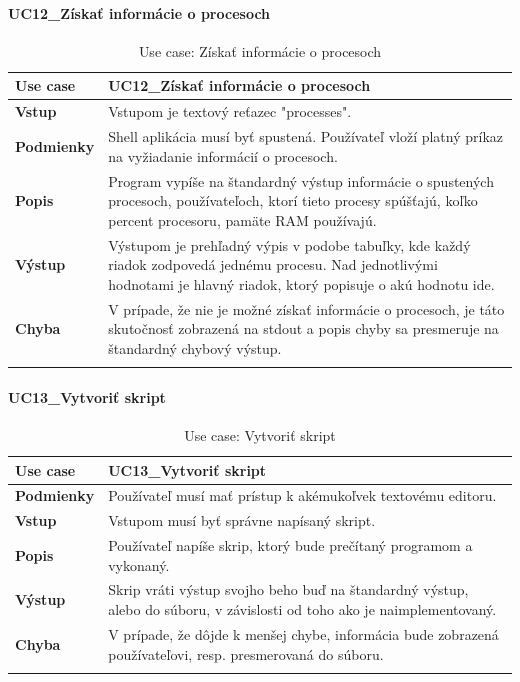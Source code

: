 \paragraph{UC12\_Získať informácie o procesoch}
\begin{center}
	\begin{longtable}{|p{2.5cm}|p{12.2cm}|}
		
			\hline
			\textbf{Use case} & UC12\_Získať informácie o procesoch \\ 
			\hline
			\textbf{Vstup} & Vstupom je textový reťazec "processes".\\
			\hline
			\textbf{Podmienky} & Shell aplikácia musí byť spustená. Používateľ vloží platný príkaz na vyžiadanie informácií o procesoch. \\ 
			\hline

			\textbf{Popis} & Program vypíše na štandardný výstup informácie o spustených procesoch, používateľoch, ktorí tieto procesy spúšťajú, koľko percent procesoru, pamäte RAM používajú.\\ 
			\hline

			\textbf{Výstup} & Výstupom je prehľadný výpis v podobe tabuľky, kde každý riadok zodpovedá jednému procesu. Nad jednotlivými hodnotami je hlavný riadok, ktorý popisuje o akú hodnotu ide.\\
			\hline
			\textbf{Chyba} & V prípade, že nie je možné získať informácie o procesoch, je táto skutočnosť zobrazená na stdout a popis chyby sa presmeruje na štandardný chybový výstup.\\
			\hline
		\caption{Use case: Získať informácie o procesoch}
		\label{table:1}
		
	\end{longtable}
\end{center}
\paragraph{UC13\_Vytvoriť skript}
\begin{center}
	\begin{longtable}{|p{2.5cm}|p{12.2cm}|}
		
			\hline
			\textbf{Use case} & UC13\_Vytvoriť skript \\ 
			\hline
			\textbf{Podmienky} & Používateľ musí mať prístup k akémukoľvek textovému editoru.  \\ 
			\hline
			\textbf{Vstup} & Vstupom musí byť správne napísaný skript. \\
			\hline
			\textbf{Popis} & Používateľ napíše skrip, ktorý bude prečítaný programom a vykonaný.\\ 
			\hline
			\textbf{Výstup} & Skrip vráti výstup svojho beho buď na štandardný výstup, alebo do súboru, v závislosti od toho ako je naimplementovaný.\\
			\hline
			\textbf{Chyba} & V prípade, že dôjde k menšej chybe, informácia bude zobrazená používateľovi, resp. presmerovaná do súboru.\\
			\hline
		\caption{Use case: Vytvoriť skript}
		\label{table:1}
		
	\end{longtable}
\end{center}
